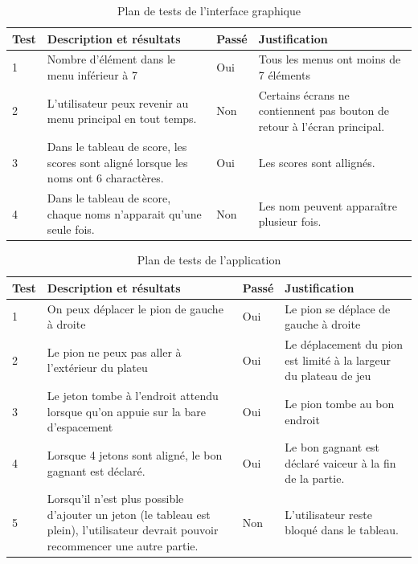 \begin{table}[H]
    \centering
    \caption{Plan de tests de l'interface graphique}
    \begin{tabular}{p{0.25in}p{2.5in}p{0.5in}p{2.5in}}
        \hline
        \bfseries Test & \bfseries Description et résultats & \bfseries Passé & \bfseries Justification \\
        \hline\hline
        1 & Nombre d'élément dans le menu inférieur à 7 & Oui & Tous les menus ont moins de 7 éléments \\
        2 & L'utilisateur peux revenir au menu principal en tout temps. & Non & Certains écrans ne contiennent pas bouton de retour à l'écran principal.\\
        3 & Dans le tableau de score, les scores sont aligné lorsque les noms ont 6 charactères. & Oui & Les scores sont allignés.\\
        4 & Dans le tableau de score, chaque noms n'apparait qu'une seule fois. & Non & Les nom peuvent apparaître plusieur fois.\\
        \hline
    \end{tabular}
\end{table}

\begin{table}[H]
    \centering
    \caption{Plan de tests de l'application}
    \begin{tabular}{p{0.25in}p{2.5in}p{0.5in}p{2.5in}}
        \hline
        \bfseries Test & \bfseries Description et résultats & \bfseries Passé & \bfseries Justification \\
        \hline\hline
        1 & On peux déplacer le pion de gauche à droite & Oui & Le pion se déplace de gauche à droite \\
        2 & Le pion ne peux pas aller à l'extérieur du plateu & Oui & Le déplacement du pion est limité à la largeur du plateau de jeu \\
        3 & Le jeton tombe à l'endroit attendu lorsque qu'on appuie sur la bare d'espacement & Oui & Le pion tombe au bon endroit \\
        4 & Lorsque 4 jetons sont aligné, le bon gagnant est déclaré. & Oui & Le bon gagnant est déclaré vaiceur à la fin de la partie.\\
        5 & Lorsqu'il n'est plus possible d'ajouter un jeton (le tableau est plein), l'utilisateur devrait pouvoir recommencer une autre partie.& Non & L'utilisateur reste bloqué dans le tableau.\\
        \hline
    \end{tabular}
\end{table}
